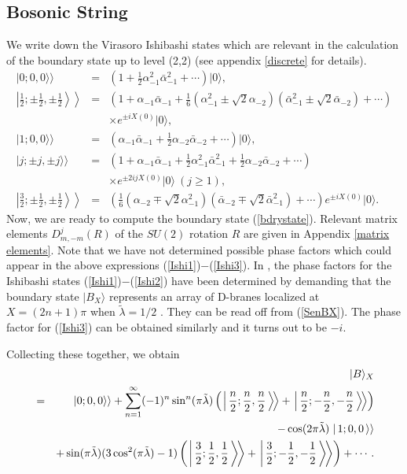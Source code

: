 \documentclass[a4paper,12pt]{article} \textheight=8.5truein
\newcommand{\dket}[1]{\left.\left|\, #1\,\right\rangle\right\rangle}
\newcommand{\dketB}[1]{\left.\left|\, #1\,\right\rangle\!\right\rangle}
\newcommand{\tlambda}{\tilde{\lambda}}
\begin{document}
\subsection{Bosonic String}
\label{boso} We write down the Virasoro Ishibashi states which are
relevant in the calculation of the boundary state up to level
(2,2) (see appendix \ref{discrete} for details).
\begin{eqnarray}
|0;0,0\rangle\rangle&=&
\left(
1+\frac{1}{2}\alpha_{-1}^2\bar{\alpha}_{-1}^2+\cdots
\right)|0\rangle,
\label{Ishi1} \\
\left.\left|\frac{1}{2};\pm\frac{1}{2},\pm\frac{1}{2}
\right\rangle\!\right\rangle &=&
\left(1+\alpha_{-1}\bar{\alpha}_{-1}+
\frac{1}{6}
(\alpha_{-1}^2\pm\sqrt{2}\alpha_{-2})
(\bar{\alpha}_{-1}^2\pm\sqrt{2}\bar{\alpha}_{-2})+
\cdots\right)\nonumber\\
&&\times e^{\pm i  X(0)}|0\rangle,\\
|1;0,0\rangle\rangle&=&
\left(\alpha_{-1}\bar{\alpha}_{-1}+
\frac{1}{2}\alpha_{-2}\bar{\alpha}_{-2}+\cdots\right)
|0\rangle,\\
|j;\pm j,\pm j\rangle\rangle&=&\left(
1+\alpha_{-1}\bar{\alpha}_{-1}+\frac{1}{2}\alpha_{-1}^2\bar{\alpha}_{-1}^2
+\frac{1}{2}\alpha_{-2}\bar{\alpha}_{-2}+\cdots
\right)\nonumber\\
&&\times e^{\pm 2i j X(0)}|0\rangle\ (j\ge 1),
\label{Ishi2}\\
\left.\left|\frac{3}{2};\pm\frac{1}{2},\pm\frac{1}{2}
\right\rangle\!\right\rangle&=&\left(\frac{1}{6}
(\alpha_{-2}\mp\sqrt{2}\alpha_{-1}^2)
(\bar{\alpha}_{-2}\mp\sqrt{2}\bar{\alpha}_{-1}^2)+\cdots\right)
 e^{\pm iX(0)}|0\rangle.
\label{Ishi3}
\end{eqnarray}
Now, we are ready to compute the boundary state (\ref{bdrystate}).
Relevant matrix elements $D^j_{m,-m}(R)$
of the $SU(2)$ rotation $R$ are given in
Appendix \ref{matrix elements}. Note that we have not determined
possible phase factors which could appear in the above expressions
(\ref{Ishi1})$-$(\ref{Ishi3}). In \cite{Sen:2002nu}, the phase
factors for the Ishibashi states (\ref{Ishi1})$-$(\ref{Ishi2}) have
been determined by demanding that the boundary state $|B_X\rangle$
represents an array of D-branes localized at $X=(2n+1)\pi$ when
$\tilde{\lambda}=1/2$ \cite{Callan:1994ub,Recknagel,Sen:1999}. They can be read
off from (\ref{SenBX}). The phase factor for (\ref{Ishi3})
can be obtained similarly and it turns out to be $-i$.

Collecting these together, we obtain
\begin{eqnarray}
&&|B\rangle_X \nonumber\\
&=&|0;0,0\rangle\rangle+\sum_{n=1}^\infty
(-1)^n\sin^n(\pi\tilde{\lambda})\left(
\dketB{{n\over2};{n\over2},{n\over2}} +
\dketB{{n\over2};-{n\over2},-{n\over2}}\right)\nonumber\\
&&-\cos(2\pi\tlambda)\dket{1;0,0}\nonumber\\
&&+\sin(\pi\tlambda)(3\cos^2(\pi\tlambda)-1) \left(
\dketB{{3\over2};{1\over2},{1\over2}} +
\dketB{{3\over2};-{1\over2},-{1\over2}} \right)+\cdots.
\end{eqnarray}
\end{document}
